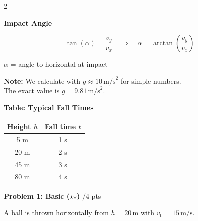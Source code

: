 \documentclass[10pt, a4paper]{article}
\newcommand{\fachfarbe}{physik}
\newcommand{\stmark}{$\star$}
\newcommand{\abschnitt}[1]{%
    \vspace{8pt}
    \noindent\textbf{\textcolor{\fachfarbe}{#1}}
    \vspace{4pt}
}
\newcommand{\punkte}[1]{\hfill\small\textcolor{grau}{/#1 pts}}
\begin{document}
\begin{multicols}{2}
\begin{formelbox}
\textbf{Impact Angle}
\vspace{2pt}

\begin{equation*}
\tan(\alpha) = \frac{v_y}{v_x} \quad \Rightarrow \quad \alpha = \arctan\left(\frac{v_y}{v_x}\right)
\end{equation*}

\vspace{2pt}
\footnotesize
$\alpha$ = angle to horizontal at impact
\end{formelbox}

\vspace{4pt}

\begin{hinweisbox}
\footnotesize
\textbf{Note:} We calculate with $g \approx 10\,\text{m/s}^2$ for simple numbers.\\
The exact value is $g = 9.81\,\text{m/s}^2$.
\end{hinweisbox}


\columnbreak


\abschnitt{Table: Typical Fall Times}

\begin{center}
\begin{tabular}{|c|c|}
\hline
\textbf{Height $h$} & \textbf{Fall time $t$} \\
\hline
5 m & 1 s \\
\hline
20 m & 2 s \\
\hline
45 m & 3 s \\
\hline
80 m & 4 s \\
\hline
\end{tabular}
\end{center}

\vspace{2pt}


\abschnitt{Problem 1: Basic (\stmark\stmark)}\punkte{4}

A ball is thrown horizontally from $h = 20\,\text{m}$ with $v_0 = 15\,\text{m/s}$.


\end{multicols}
\end{document}
